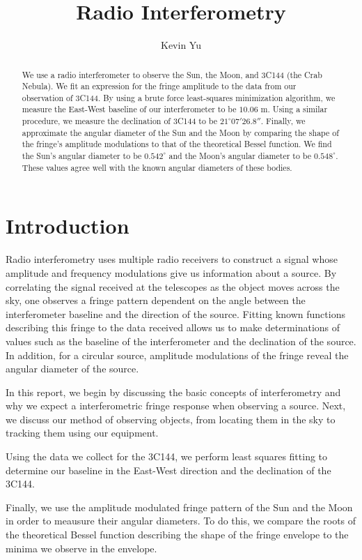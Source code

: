 \documentclass[12pt]{article}
\title{Radio Interferometry}
\author {
Kevin Yu
}
\begin{document}
\maketitle

\begin{abstract}
We use a radio interferometer to observe the Sun, the Moon, and 3C144 (the Crab Nebula). We fit an expression for the fringe amplitude to the data from our observation of 3C144. By using a brute force least-squares minimization algorithm, we measure the East-West baseline of our interferometer to be $10.06$ m. Using a similar procedure, we measure the declination of 3C144 to be $21^\circ 07' 26.8''$. Finally, we approximate the angular diameter of the Sun and the Moon by comparing the shape of the fringe's amplitude modulations to that of the theoretical Bessel function. We find the Sun's angular diameter to be $0.542^\circ$ and the Moon's angular diameter to be $0.548^\circ$. These values agree well with the known angular diameters of these bodies.
\end{abstract}

\section{Introduction}
Radio interferometry uses multiple radio receivers to construct a signal whose amplitude and frequency modulations give us information about a source. By correlating the signal received at the telescopes as the object moves across the sky, one observes a fringe pattern dependent on the angle between the interferometer baseline and the direction of the source. Fitting known functions describing this fringe to the data received allows us to make determinations of values such as the baseline of the interferometer and the declination of the source. In addition, for a circular source, amplitude modulations of the fringe reveal the angular diameter of the source.

In this report, we begin by discussing the basic concepts of interferometry and why we expect a interferometric fringe response when observing a source. Next, we discuss our method of observing objects, from locating them in the sky to tracking them using our equipment.

Using the data we collect for the 3C144, we perform least squares fitting to determine our baseline in the East-West direction and the declination of the 3C144.

Finally, we use the amplitude modulated fringe pattern of the Sun and the Moon in order to meausure their angular diameters. To do this, we compare the roots of the theoretical Bessel function describing the shape of the fringe envelope to the minima we observe in the envelope.
\end{document}

